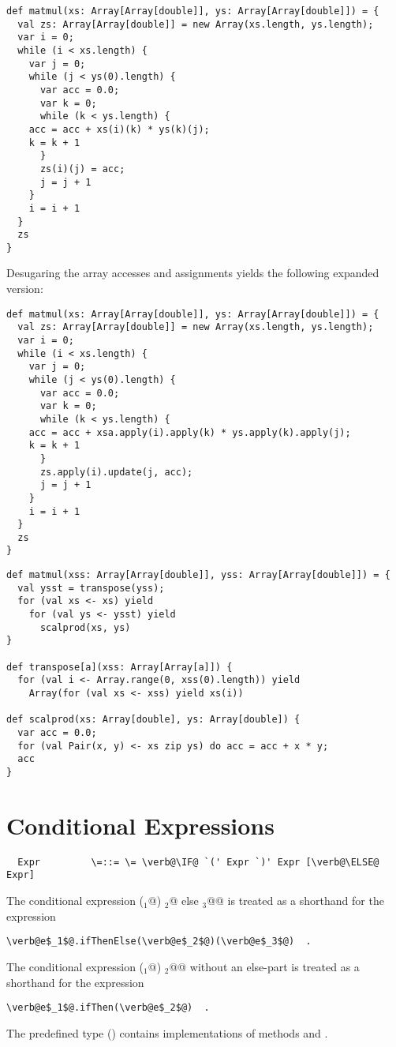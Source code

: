 \documentclass[11pt]{report}
\begin{document}
\begin{verbatim}
def matmul(xs: Array[Array[double]], ys: Array[Array[double]]) = {
  val zs: Array[Array[double]] = new Array(xs.length, ys.length);
  var i = 0;
  while (i < xs.length) {
    var j = 0;
    while (j < ys(0).length) {
      var acc = 0.0;
      var k = 0;
      while (k < ys.length) {
	acc = acc + xs(i)(k) * ys(k)(j);
	k = k + 1
      }
      zs(i)(j) = acc;
      j = j + 1
    }
    i = i + 1
  }
  zs
}
\end{verbatim}
Desugaring the array accesses and assignments yields the following
expanded version:
\begin{verbatim}
def matmul(xs: Array[Array[double]], ys: Array[Array[double]]) = {
  val zs: Array[Array[double]] = new Array(xs.length, ys.length);
  var i = 0;
  while (i < xs.length) {
    var j = 0;
    while (j < ys(0).length) {
      var acc = 0.0;
      var k = 0;
      while (k < ys.length) {
	acc = acc + xsa.apply(i).apply(k) * ys.apply(k).apply(j);
	k = k + 1
      }
      zs.apply(i).update(j, acc);
      j = j + 1
    }
    i = i + 1
  }
  zs
}
\end{verbatim}

\begin{verbatim}
def matmul(xss: Array[Array[double]], yss: Array[Array[double]]) = {
  val ysst = transpose(yss);
  for (val xs <- xs) yield
    for (val ys <- ysst) yield 
      scalprod(xs, ys)
}

def transpose[a](xss: Array[Array[a]]) {
  for (val i <- Array.range(0, xss(0).length)) yield
    Array(for (val xs <- xss) yield xs(i))

def scalprod(xs: Array[double], ys: Array[double]) {
  var acc = 0.0;
  for (val Pair(x, y) <- xs zip ys) do acc = acc + x * y; 
  acc
}
\end{verbatim}


\section{Conditional Expressions}

\syntax\begin{verbatim}
  Expr	       \=::= \= \verb@\IF@ `(' Expr `)' Expr [\verb@\ELSE@ Expr]
\end{verbatim}

The conditional expression \verb@if (\verb@e$_1$@) \verb@e$_2$@ else \verb@e$_3$@@ is treated as
a shorthand for the expression
\begin{verbatim}
\verb@e$_1$@.ifThenElse(\verb@e$_2$@)(\verb@e$_3$@)  .
\end{verbatim}
The conditional expression \verb@if (\verb@e$_1$@) \verb@e$_2$@@ without an
else-part is treated as a shorthand for the expression
\begin{verbatim}
\verb@e$_1$@.ifThen(\verb@e$_2$@)  .
\end{verbatim}
The predefined type \verb@Boolean@ ()
contains implementations of
methods \verb@ifThen@ and \verb@ifThenElse@.
\end{document}
